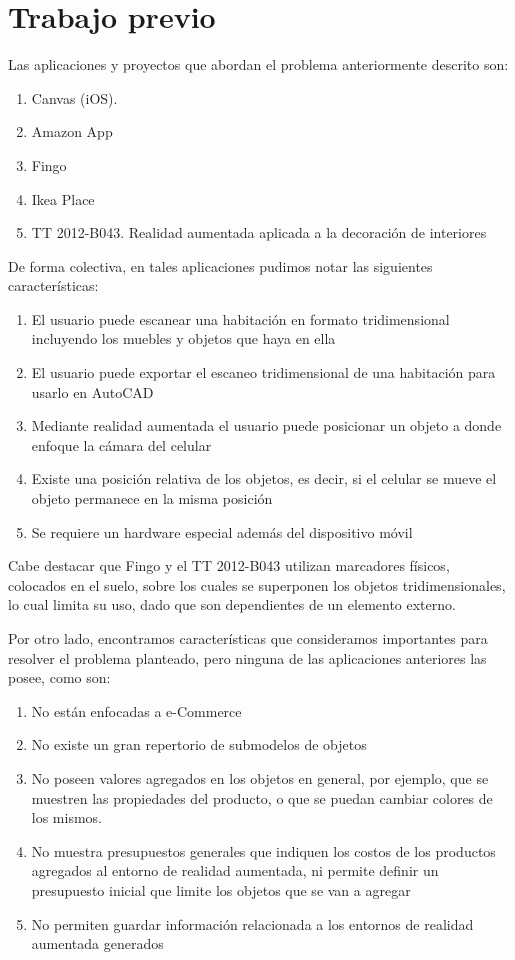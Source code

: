 \section{Trabajo previo}
Las aplicaciones y proyectos que abordan el problema anteriormente descrito son:

\begin{enumerate}
	\item Canvas (iOS).
	\item Amazon App
	\item Fingo
	\item Ikea Place
	\item TT 2012-B043. Realidad aumentada aplicada a la decoración de interiores
\end{enumerate}

De forma colectiva, en tales aplicaciones pudimos notar las siguientes características:

\begin{enumerate}
	\item El usuario puede escanear una habitación en formato tridimensional incluyendo los muebles y objetos que haya en ella
	\item El usuario puede exportar el escaneo tridimensional de una habitación para usarlo en AutoCAD
	\item Mediante realidad aumentada el usuario puede posicionar un objeto a donde enfoque la cámara del celular
	\item Existe una posición relativa de los objetos, es decir, si el celular se mueve el objeto permanece en la misma posición
	\item Se requiere un hardware especial además del dispositivo móvil
\end{enumerate}

Cabe destacar que Fingo y el TT 2012-B043 utilizan marcadores físicos, colocados en el suelo, sobre los cuales se superponen los objetos tridimensionales, lo cual limita su uso, dado que son dependientes de un elemento externo.\par
Por otro lado, encontramos características que consideramos importantes para resolver el problema planteado, pero ninguna de las aplicaciones anteriores las posee, como son:


\begin{enumerate}
	\item No están enfocadas a e-Commerce
	\item No existe un gran repertorio de submodelos de objetos
	\item No poseen valores agregados en los objetos en general, por ejemplo, que se muestren las propiedades del producto, o que se puedan cambiar colores de los mismos.
	\item No muestra presupuestos generales que indiquen los costos de los productos agregados al entorno de realidad aumentada, ni permite definir un presupuesto inicial que limite los objetos que se van a agregar
	\item No permiten guardar información relacionada a los entornos de realidad aumentada generados
\end{enumerate}

